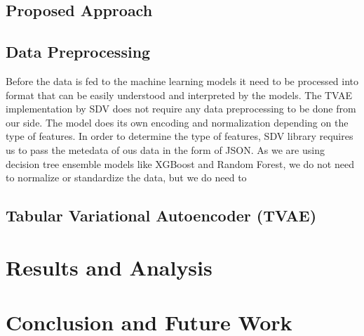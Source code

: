 \documentclass[twoside,11pt]{article}
\begin{document}
\subsection{Proposed Approach}




\subsection{Data Preprocessing}
Before the data is fed to the machine learning models it need to be processed into format that can be easily understood and interpreted by the models. The TVAE implementation by SDV does not require any data preprocessing to be done from our side. The model does its own encoding and normalization depending on the type of features. In order to determine the type of features, SDV library requires us to pass the metedata of ous data in the form of JSON. As we are using decision tree ensemble models like XGBoost and Random Forest, we do not need to normalize or standardize the data, but we do need to 


\subsection{Tabular Variational Autoencoder (TVAE)}

\section{Results and Analysis}

\section{Conclusion and Future Work}

















\appendix

\vskip 0.2in

\end{document}

